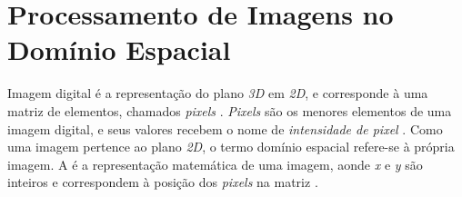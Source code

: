 
%




\section{Processamento de Imagens no Domínio Espacial}

\par Imagem digital é a representação do plano \textit{3D} em \textit{2D}, e corresponde à uma matriz de elementos, chamados \textit{pixels} \cite{gonsalez2006}. \textit{Pixels} são os menores elementos de uma imagem digital, e seus valores recebem o nome de \textit{intensidade de pixel} \cite{gonsalez2006}. Como uma imagem pertence ao plano \textit{2D}, o termo domínio espacial refere-se à própria imagem. A  é a representação matemática de uma imagem, aonde \textit{x} e \textit{y} são inteiros e correspondem à posição dos \textit{pixels} na matriz \cite{gonsalez2006}.

